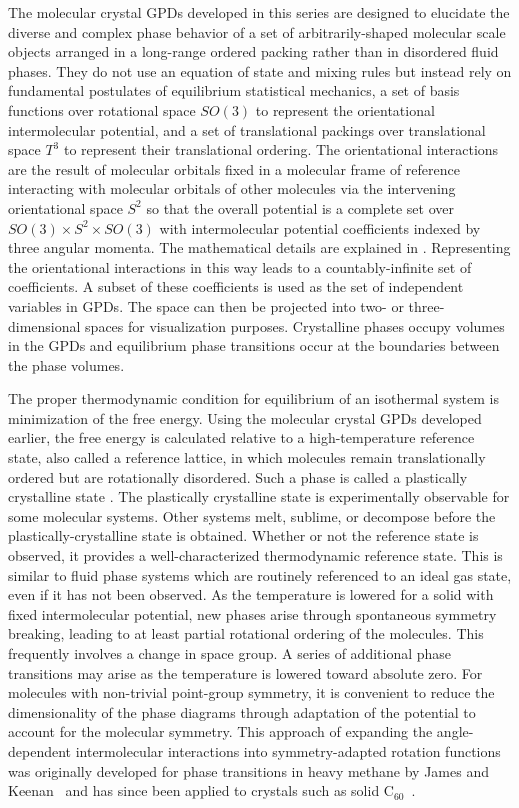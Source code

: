 \documentclass[preprint]{iucr}              %
\begin{document}
The molecular crystal GPDs developed in this series are designed to elucidate the diverse and complex phase behavior of a set of arbitrarily-shaped molecular scale objects arranged in a long-range ordered packing rather than in disordered fluid phases.  They do not use an equation of state and mixing rules but instead rely on fundamental postulates of equilibrium statistical mechanics, a set of basis functions over rotational space $SO(3)$ to represent the orientational intermolecular potential, and a set of translational packings over translational space $T^3$ to represent their translational ordering.  The orientational interactions are the result of molecular orbitals fixed in a molecular frame of reference interacting with molecular orbitals of other molecules via the intervening orientational space $S^2$ so that the overall potential is a complete set over $SO(3) \times S^2 \times SO(3)$ with intermolecular potential coefficients indexed by three angular momenta.  The mathematical details are explained in \cite{Mettes04}.  Representing the orientational interactions in this way leads to a countably-infinite set of coefficients.  A subset of these coefficients is used as the set of independent variables in GPDs.  The space can then be projected into two- or three-dimensional spaces for visualization purposes.  Crystalline phases occupy volumes in the GPDs and equilibrium phase transitions occur at the boundaries between the phase volumes.  

The proper thermodynamic condition for equilibrium of an isothermal system is minimization of the free energy.  Using the molecular crystal GPDs developed earlier, the free energy is calculated relative to a high-temperature reference state, also called a reference lattice, in which molecules remain translationally ordered but are rotationally disordered.  Such a phase is called a plastically crystalline state \cite{Sherwood79}.  The plastically crystalline state is experimentally observable for some molecular systems.  Other systems melt, sublime, or decompose before the plastically-crystalline state is obtained.  Whether or not the reference state is observed, it provides a well-characterized thermodynamic reference state.  This is similar to fluid phase systems which are routinely referenced to an ideal gas state, even if it has not been observed.  As the temperature is lowered for a solid with fixed intermolecular potential, new phases arise through spontaneous symmetry breaking, leading to at least partial rotational ordering of the molecules.  This frequently involves a change in space group.  A series of additional phase transitions may arise as the temperature is lowered toward absolute zero. For molecules with non-trivial point-group symmetry, it is convenient to reduce the dimensionality of the phase diagrams through adaptation of the potential to account for the molecular symmetry. This approach of expanding the angle-dependent intermolecular interactions into symmetry-adapted rotation functions was originally developed for phase transitions in heavy methane by James and Keenan~\cite{James59} and has since been applied to crystals such as solid C$_{60}$~\cite{Michel92,Lamoen99}. 
\end{document}
